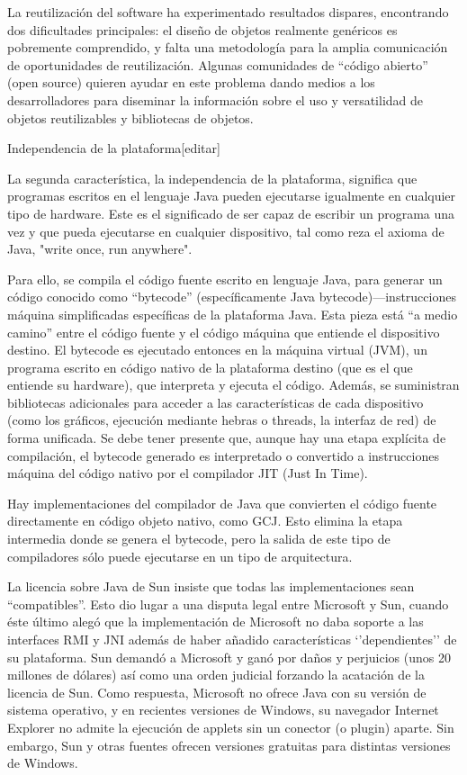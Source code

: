 \documentclass[11pt,a4paper]{book}
\begin{document}
	\bigskip
							La reutilización del software ha experimentado resultados dispares, encontrando dos dificultades principales: el diseño de objetos realmente genéricos es pobremente comprendido, y falta una metodología para la amplia comunicación de oportunidades de reutilización. Algunas comunidades de “código abierto” (open source) quieren ayudar en este problema dando medios a los desarrolladores para diseminar la información sobre el uso y versatilidad de objetos reutilizables y bibliotecas de objetos.
	\bigskip
							
	\bigskip
							Independencia de la plataforma[editar]
	\bigskip
							
	\bigskip
							La segunda característica, la independencia de la plataforma, significa que programas escritos en el lenguaje Java pueden ejecutarse igualmente en cualquier tipo de hardware. Este es el significado de ser capaz de escribir un programa una vez y que pueda ejecutarse en cualquier dispositivo, tal como reza el axioma de Java, "write once, run anywhere".
	\bigskip
							
	\bigskip
							Para ello, se compila el código fuente escrito en lenguaje Java, para generar un código conocido como “bytecode” (específicamente Java bytecode)—instrucciones máquina simplificadas específicas de la plataforma Java. Esta pieza está “a medio camino” entre el código fuente y el código máquina que entiende el dispositivo destino. El bytecode es ejecutado entonces en la máquina virtual (JVM), un programa escrito en código nativo de la plataforma destino (que es el que entiende su hardware), que interpreta y ejecuta el código. Además, se suministran bibliotecas adicionales para acceder a las características de cada dispositivo (como los gráficos, ejecución mediante hebras o threads, la interfaz de red) de forma unificada. Se debe tener presente que, aunque hay una etapa explícita de compilación, el bytecode generado es interpretado o convertido a instrucciones máquina del código nativo por el compilador JIT (Just In Time).
	\bigskip
							
	\bigskip
							Hay implementaciones del compilador de Java que convierten el código fuente directamente en código objeto nativo, como GCJ. Esto elimina la etapa intermedia donde se genera el bytecode, pero la salida de este tipo de compiladores sólo puede ejecutarse en un tipo de arquitectura.
	\bigskip
							
	\bigskip
							La licencia sobre Java de Sun insiste que todas las implementaciones sean “compatibles”. Esto dio lugar a una disputa legal entre Microsoft y Sun, cuando éste último alegó que la implementación de Microsoft no daba soporte a las interfaces RMI y JNI además de haber añadido características ‘’dependientes’’ de su plataforma. Sun demandó a Microsoft y ganó por daños y perjuicios (unos 20 millones de dólares) así como una orden judicial forzando la acatación de la licencia de Sun. Como respuesta, Microsoft no ofrece Java con su versión de sistema operativo, y en recientes versiones de Windows, su navegador Internet Explorer no admite la ejecución de applets sin un conector (o plugin) aparte. Sin embargo, Sun y otras fuentes ofrecen versiones gratuitas para distintas versiones de Windows.
	\bigskip
							
\end{document}
